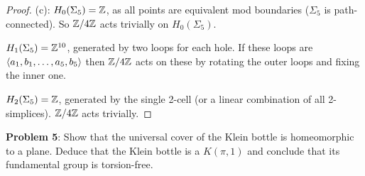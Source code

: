 \documentclass{amsart}
\begin{document}
\begin{proof}
	
	(c): $H_0(\Sigma_5)=\mathbb{Z}$, as all points are equivalent mod boundaries ($\Sigma_5$ is path-connected). So $\mathbb{Z}/4\mathbb{Z}$ acts trivially on $H_0(\Sigma_5)$.
	
	$H_1(\Sigma_5)=\mathbb{Z}^{10}$, generated by two loops for each hole. If these loops are $\langle a_1,b_1,\dots,a_5,b_5\rangle$ then $\mathbb{Z}/4\mathbb{Z}$ acts on these by rotating the outer loops and fixing the inner one.
	
	$H_2(\Sigma_5)=\mathbb{Z}$, generated by the single 2-cell (or a linear combination of all 2-simplices). $\mathbb{Z}/4\mathbb{Z}$ acts trivially.
	
	\end{proof}
	 
	 \newpage
	 \textbf{Problem 5}: Show that the universal cover of the Klein bottle is homeomorphic to a plane. Deduce that the Klein bottle is a $K(\pi,1)$ and conclude that its fundamental group is torsion-free.
	 
\end{document}

